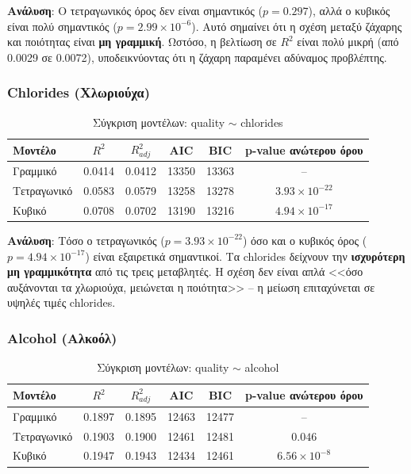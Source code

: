 \documentclass[12pt,a4paper]{article}
\begin{document}
\textbf{Ανάλυση}: Ο τετραγωνικός όρος δεν είναι σημαντικός ($p = 0.297$), αλλά ο κυβικός είναι πολύ σημαντικός ($p = 2.99 \times 10^{-6}$). Αυτό σημαίνει ότι η σχέση μεταξύ ζάχαρης και ποιότητας είναι \textbf{μη γραμμική}. Ωστόσο, η βελτίωση σε $R^2$ είναι πολύ μικρή (από 0.0029 σε 0.0072), υποδεικνύοντας ότι η ζάχαρη παραμένει αδύναμος προβλέπτης.

\subsubsection{Chlorides (Χλωριούχα)}

\begin{table}[H]
\centering
\caption{Σύγκριση μοντέλων: quality $\sim$ chlorides}
\begin{tabular}{lccccc}
\toprule
\textbf{Μοντέλο} & $R^2$ & $R^2_{adj}$ & \textbf{AIC} & \textbf{BIC} & \textbf{p-value ανώτερου όρου} \\
\midrule
Γραμμικό & 0.0414 & 0.0412 & 13350 & 13363 & -- \\
Τετραγωνικό & 0.0583 & 0.0579 & 13258 & 13278 & $3.93 \times 10^{-22}$ \\
Κυβικό & 0.0708 & 0.0702 & 13190 & 13216 & $4.94 \times 10^{-17}$ \\
\bottomrule
\end{tabular}
\end{table}

\textbf{Ανάλυση}: Τόσο ο τετραγωνικός ($p = 3.93 \times 10^{-22}$) όσο και ο κυβικός όρος ($p = 4.94 \times 10^{-17}$) είναι εξαιρετικά σημαντικοί. Τα chlorides δείχνουν την \textbf{ισχυρότερη μη γραμμικότητα} από τις τρεις μεταβλητές. Η σχέση δεν είναι απλά <<όσο αυξάνονται τα χλωριούχα, μειώνεται η ποιότητα>> -- η μείωση επιταχύνεται σε υψηλές τιμές chlorides.

\subsubsection{Alcohol (Αλκοόλ)}

\begin{table}[H]
\centering
\caption{Σύγκριση μοντέλων: quality $\sim$ alcohol}
\begin{tabular}{lccccc}
\toprule
\textbf{Μοντέλο} & $R^2$ & $R^2_{adj}$ & \textbf{AIC} & \textbf{BIC} & \textbf{p-value ανώτερου όρου} \\
\midrule
Γραμμικό & 0.1897 & 0.1895 & 12463 & 12477 & -- \\
Τετραγωνικό & 0.1903 & 0.1900 & 12461 & 12481 & $0.046$ \\
Κυβικό & 0.1947 & 0.1943 & 12434 & 12461 & $6.56 \times 10^{-8}$ \\
\bottomrule
\end{tabular}
\end{table}
\end{document}
